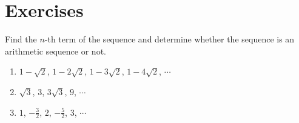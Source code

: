 

\newpage

\section*{Exercises}

\begin{exercise}
Find the $n$-th term of the sequence and determine whether the sequence is an arithmetic sequence or not. 
\begin{enumerate}
    \item $1-\sqrt{2}$, $1-2\sqrt{2}$, $1-3\sqrt{2}$, $1-4\sqrt{2}$, $\cdots$
    \item $\sqrt{3}$, $3$, $3\sqrt{3}$, $9$, $\cdots$
    \item $1$, $-\frac{3}{2}$, $2$, $-\frac{5}{2}$, $3$, $\cdots$
\end{enumerate}
\end{exercise}

